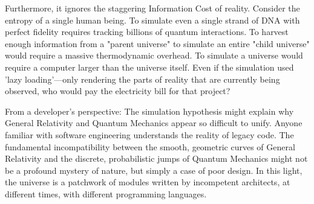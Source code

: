 Furthermore, it ignores the staggering Information Cost of reality. 
Consider the entropy of a single human being. To simulate even a single strand of DNA with perfect fidelity requires tracking billions of quantum interactions. 
To harvest enough information from a "parent universe" to simulate an entire "child universe" would require a massive thermodynamic overhead.
To simulate a universe would require a computer larger than the universe itself. Even if the simulation used 'lazy loading'—only rendering the parts of reality that are currently being observed, 
who would pay the electricity bill for that project?

From a developer's perspective: The simulation hypothesis might explain why General Relativity and Quantum Mechanics appear so difficult to unify.
Anyone familiar with software engineering understands the reality of legacy code.
The fundamental incompatibility between the smooth, geometric curves of General Relativity and the discrete, probabilistic jumps of Quantum Mechanics might not be a profound mystery of nature, but simply a case of poor design.
In this light, the universe is a patchwork of modules written by incompetent architects, at different times, with different programming languages.

